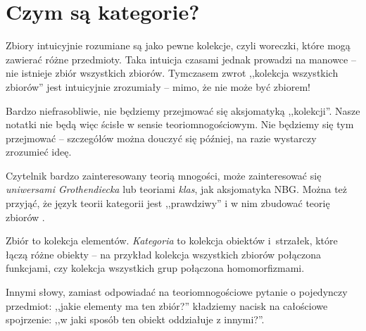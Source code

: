 \section{Czym są kategorie?}
\begin{remk}
  Zbiory intuicyjnie rozumiane są jako pewne kolekcje, czyli woreczki, które mogą zawierać różne przedmioty. Taka intuicja czasami jednak prowadzi na manowce -- nie istnieje zbiór wszystkich zbiorów. Tymczasem zwrot ,,kolekcja wszystkich zbiorów'' jest intuicyjnie zrozumiały -- mimo, że nie może być zbiorem!

  Bardzo niefrasobliwie, nie będziemy przejmować się aksjomatyką ,,kolekcji''. Nasze notatki nie będą więc ścisłe w sensie teoriomnogościowym. Nie będziemy się tym przejmować -- szczegółów można douczyć się później, na razie wystarczy zrozumieć ideę.

  Czytelnik bardzo zainteresowany teorią mnogości, może zainteresować się \emph{uniwersami Grothendiecka} lub teoriami \emph{klas}, jak aksjomatyka NBG. Można też przyjąć, że język teorii kategorii jest ,,prawdziwy'' i w nim zbudować teorię zbiorów \cite{rethinking_set_theory}.
\end{remk}

\begin{idea}
  Zbiór to kolekcja elementów. \emph{Kategoria} to kolekcja obiektów i~strzałek, które łączą różne obiekty -- na przykład kolekcja wszystkich zbiorów połączona funkcjami, czy kolekcja wszystkich grup połączona homomorfizmami.

  Innymi słowy, zamiast odpowiadać na teoriomnogościowe pytanie o pojedynczy przedmiot: ,,jakie elementy ma ten zbiór?'' kładziemy nacisk na całościowe spojrzenie: ,,w jaki sposób ten obiekt oddziałuje z innymi?''.
\end{idea}

